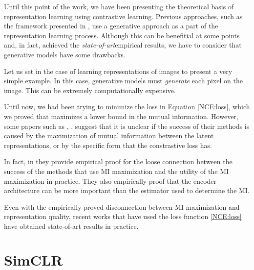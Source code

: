 \label{Chapter:SimCLR}
Until this point of the work, we have been presenting the theoretical basis of representation learning using contrastive learning. Previous approaches, such as  the framework presented in \cite{oord_representation_2019}, use a generative approach as a part of the representation learning process. Although this can be benefitial at some points and, in fact, achieved the \emph{state-of-art}\footnotemark empirical results, we have to consider that generative models have some drawbacks. 



Let us set in the case of learning representations of images to present a very simple example. In this case, generative models must \emph{generate} each pixel on the image. This can be extremely computationally expensive. 

Until now, we had been trying to minimize the loss in Equation \eqref{NCE:loss}, which we proved that maximizes a lower bound in the mutual information. However, some papers such as \cite{chen_simple_2020}, \cite{tschannen_mutual_2020}, suggest that it is unclear if the success of their methods is caused by the maximization of mutual information between the latent representations, or by the specific form that the constrastive loss has.

In fact, in \cite{tschannen_mutual_2020} they provide empirical proof for the loose connection between the success of the methods that use MI maximization and the utility of the MI maximization in practice. They also empirically proof  that the encoder architecture can be more important than the estimator used to determine the MI.

Even with the empirically proved disconnection between MI maximization and representation quality, recent works that have used the loss function \eqref{NCE:loss} have obtained state-of-art results in practice. 

\section{SimCLR}

